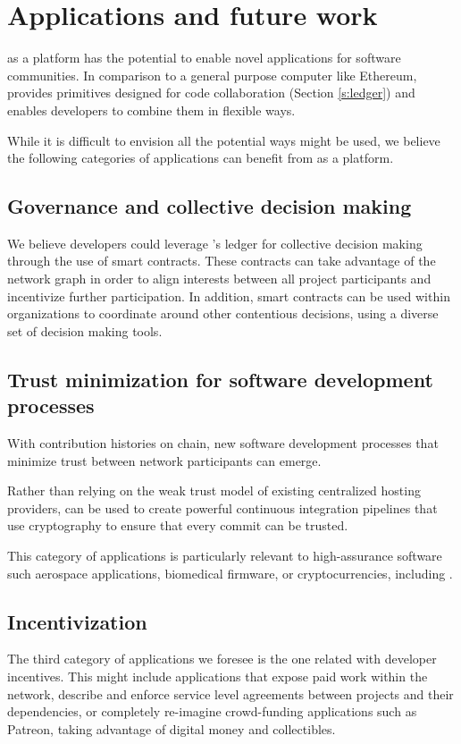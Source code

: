 
\section{Applications and future work}

\Oscoin{} as a platform has the potential to enable novel applications for
software communities. In comparison to a general purpose computer like
Ethereum, \oscoin{} provides primitives designed for code collaboration
(Section \ref{s:ledger}) and enables developers to combine them in flexible ways.

While it is difficult to envision all the potential ways \oscoin{} might be used, we
believe the following categories of applications can benefit from \oscoin{}
as a platform.

\subsection{Governance and collective decision making}

We believe developers could leverage \oscoin{}’s ledger for collective decision
making through the use of smart contracts. These contracts can take advantage of the
network graph in order to align interests between all project participants and
incentivize further participation. In addition, smart contracts can be used
within organizations to coordinate around other contentious decisions, using a
diverse set of decision making tools.

\subsection{Trust minimization for software development processes}
With contribution histories on chain, new software development processes that
minimize trust between network participants can emerge.

Rather than relying on the weak trust model of existing centralized hosting
providers, \oscoin{} can be used to create powerful continuous integration
pipelines that use cryptography to ensure that every commit can be trusted.

This category of applications is particularly relevant to high-assurance
software such aerospace applications, biomedical firmware, or cryptocurrencies,
including \oscoin{}.

\subsection{Incentivization}
The third category of applications we foresee is the one related with
developer incentives. This might include applications that expose paid work
within the \oscoin{} network, describe and enforce service level agreements
between projects and their dependencies, or completely re-imagine crowd-funding
applications such as Patreon, taking advantage of digital money and collectibles.

